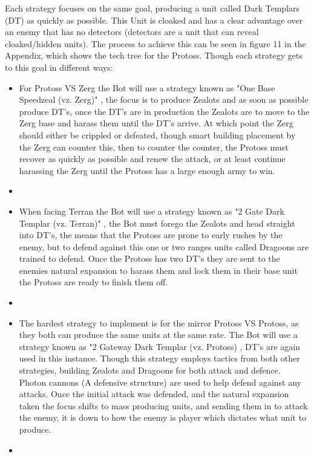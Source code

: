 \documentclass[journal]{IEEEtran}
\begin{document}
	Each strategy focuses on the same goal, producing a unit called Dark Templars (DT) as quickly as possible. This Unit is cloaked and has a clear advantage over an enemy that has no detectors (detectors are a unit that can reveal cloaked/hidden units). The process to achieve this can be seen in figure 11 in the Appendix, which shows the tech tree for the Protoss.
	Though each strategy gets to this goal in different ways:
	
	\begin{itemize}
		\item For Protoss VS Zerg the Bot will use a strategy known as "One Base Speedzeal (vz. Zerg)" \cite{PVZ}, the focus is to produce Zealots and as soon as possible produce DT's, once the DT's are in production the Zealots are to move to the Zerg base and harass them until the DT's arrive. At which point the Zerg should either be crippled or defeated, though smart building placement by the Zerg can counter this, then to counter the counter, the Protoss must recover as quickly as possible and renew the attack, or at least continue harassing the Zerg until the Protoss has a large enough army to win.
		\item[]
		\item When facing Terran the Bot will use a strategy known as "2 Gate Dark Templar (vz. Terran)" \cite{PVT}, the Bot must forego the Zealots and head straight into DT's, the means that the Protoss are prone to early rushes by the enemy, but to defend against this one or two ranges units called Dragoons are trained to defend. Once the Protoss has two DT's they are sent to the enemies natural expansion to harass them and lock them in their base unit the Protoss are ready to finish them off.
		\item[]
		\item The hardest strategy to implement is for the mirror Protoss VS Protoss, as they both can produce the same units at the same rate. The Bot will use a strategy known as "2 Gateway Dark Templar (vz. Protoss) \cite{PVP}, DT's are again used in this instance. Though this strategy employs tactics from both other strategies, building Zealots and Dragoons for both attack and defence. Photon cannons (A defensive structure) are used to help defend against any attacks. Once the initial attack was defended, and the natural expansion taken the focus shifts to mass producing units, and sending them in to attack the enemy, it is down to how the enemy is player which dictates what unit to produce.
		\item[]
	\end{itemize}
	
\end{document}
